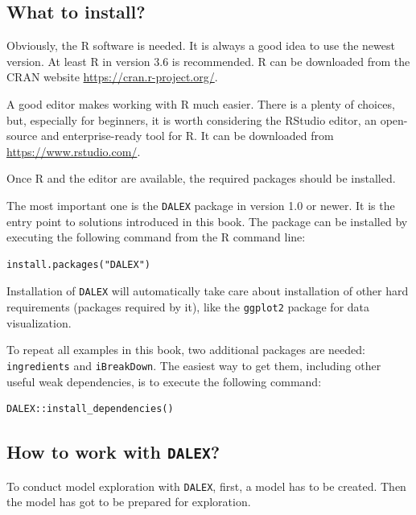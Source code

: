 \documentclass[12pt,]{krantz}
\begin{document}
\hypertarget{what-to-install}{%
\subsection{What to install?}\label{what-to-install}}

Obviously, the R software \citep{RcoreT} is needed. It is always a good idea to use the newest version. At least R in version 3.6 is recommended. R can be downloaded from the CRAN website \url{https://cran.r-project.org/}.

A good editor makes working with R much easier. There is a plenty of choices, but, especially for beginners, it is worth considering the RStudio editor, an open-source and enterprise-ready tool for R. It can be downloaded from \url{https://www.rstudio.com/}.

Once R and the editor are available, the required packages should be installed.

The most important one is the \texttt{DALEX} package in version 1.0 or newer. It is the entry point to solutions introduced in this book. The package can be installed by executing the following command from the R command line:

\begin{verbatim}
install.packages("DALEX")
\end{verbatim}

Installation of \texttt{DALEX} will automatically take care about installation of other hard requirements (packages required by it), like the \texttt{ggplot2} package for data visualization.

To repeat all examples in this book, two additional packages are needed: \texttt{ingredients} and \texttt{iBreakDown}. The easiest way to get them, including other useful weak dependencies, is to execute the following command:

\begin{verbatim}
DALEX::install_dependencies()
\end{verbatim}

\hypertarget{how-to-work-with-dalex}{%
\subsection{\texorpdfstring{How to work with \texttt{DALEX}?}{How to work with DALEX?}}\label{how-to-work-with-dalex}}

To conduct model exploration with \texttt{DALEX}, first, a model has to be created. Then the model has got to be prepared for exploration.
\end{document}
